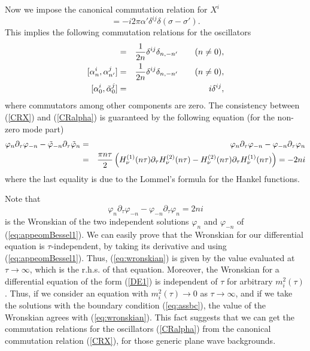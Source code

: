 \documentclass[a4paper,12pt]{article}
\begin{document}
Now we impose the canonical commutation relation for $X^i$ 
\begin{equation}
[X^{i}(\tau,\sigma),\partial_\tau X^{j}(\tau,\sigma')]
=-i 2\pi\alpha' \delta^{ij} \delta(\sigma-\sigma').
\label{CRX}
\end{equation}
This implies the following
commutation relations for the oscillators
\begin{eqnarray}
[\tilde{\alpha}^{i}_{n},\tilde{\alpha}^{j}_{n'}]
&=&{1\over 2n}\delta^{ij}\delta_{n,-n'}\qquad (n\neq 0),\nonumber\\
{}[\alpha^{i}_{n},\alpha{}^{j}_{n'}]
&=&{1\over 2n}\delta^{ij}\delta_{n,-n'}\qquad (n\neq 0),\nonumber\\
{}[\alpha^{i}_{0},\tilde{\alpha}^{j}_{0}]&=&i\delta^{ij},
\label{CRalpha}
\end{eqnarray}
where commutators among other components are zero.
The consistency between (\ref{CRX}) and  (\ref{CRalpha}) 
is guaranteed by the following equation (for the non-zero
mode part) 
\begin{eqnarray}
\varphi_{n}\partial_{\tau}\varphi_{-n}
-\tilde{\varphi}_{-n}\partial_{\tau}\tilde{\varphi}_{n}
&=&\varphi_{n}\partial_{\tau}\varphi_{-n}
-\varphi_{-n}\partial_{\tau}\varphi_{n}\\
&=&{\pi n\tau\over 2}\left( 
H^{(1)}_{\nu}(n\tau)\partial_{\tau}H^{(2)}_{\nu}(n\tau)
-H^{(2)}_{\nu}(n\tau)\partial_{\tau}H^{(1)}_{\nu}(n\tau)\right)
=-{2ni}\nonumber
\label{eq:lommel}
\end{eqnarray}
where the last equality is due to the Lommel's formula 
for the Hankel functions. 

Note that 
\begin{equation}
\varphi_{n}\partial_{\tau}
\varphi_{-n}-\varphi_{-n}\partial_{\tau}\varphi_{n}=2ni
\label{eq:wronskian}
\end{equation}
is the Wronskian of the two independent solutions
$\varphi_{n}$ and $\varphi_{-n}$ of (\ref{eq:appeomBessel1}). 
We can easily prove that the Wronskian for our 
differential equation is $\tau$-independent,
by taking its derivative and using (\ref{eq:appeomBessel1}).
Thus, (\ref{eq:wronskian}) is given by the value evaluated
at $\tau\rightarrow \infty$, which is the r.h.s. of that
equation.
Moreover, the Wronskian for a differential equation of 
the form (\ref{DE1}) is independent of $\tau$ 
for arbitrary $m^{2}_{i}(\tau)$. 
Thus, if we consider an equation with $m^{2}_{i}(\tau)\rightarrow 
0$ as $\tau\rightarrow\infty$, and if we take the 
solutions with the boundary condition (\ref{eq:assbc}), 
the value of the Wronskian agrees with (\ref{eq:wronskian}).
This fact suggests that we can get
the commutation relations for the oscillators 
(\ref{CRalpha}) from the canonical commutation
relation (\ref{CRX}), for those generic plane wave backgrounds.
\end{document}
